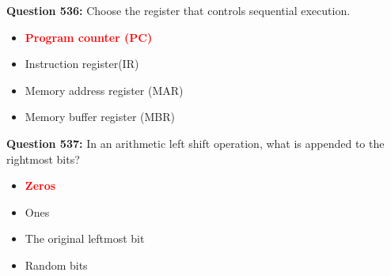 \documentclass[12pt,a4paper]{article}
\begin{document}
\textbf{Question 536:} Choose the register that controls sequential execution.

\begin{itemize}
    \item[\textbf{A.}] \textcolor{red}{\textbf{Program counter (PC)}}
    \item[\textbf{B.}] Instruction register(IR)
    \item[\textbf{C.}] Memory address register (MAR)
    \item[\textbf{D.}] Memory buffer register (MBR)
\end{itemize}

\vspace{0.5cm}

\textbf{Question 537:} In an arithmetic left shift operation, what is appended to the rightmost bits?

\begin{itemize}
    \item[\textbf{A.}] \textcolor{red}{\textbf{Zeros}}
    \item[\textbf{B.}] Ones
    \item[\textbf{C.}] The original leftmost bit
    \item[\textbf{D.}] Random bits
\end{itemize}

\vspace{0.5cm}
\end{document}
